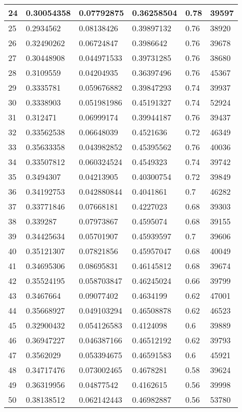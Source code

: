 \begin{longtable}{|l|l|l|l|l|l|}
24 & 0.30054358 & 0.07792875 & 0.36258504 & 0.78 & 39597 \\ \hline 
25 & 0.2934562 & 0.08138426 & 0.39897132 & 0.76 & 38920 \\ \hline 
26 & 0.32490262 & 0.06724847 & 0.3986642 & 0.76 & 39678 \\ \hline 
27 & 0.30448908 & 0.044971533 & 0.39731285 & 0.76 & 38680 \\ \hline 
28 & 0.3109559 & 0.04204935 & 0.36397496 & 0.76 & 45367 \\ \hline 
29 & 0.3335781 & 0.059676882 & 0.39847293 & 0.74 & 39937 \\ \hline 
30 & 0.3338903 & 0.051981986 & 0.45191327 & 0.74 & 52924 \\ \hline 
31 & 0.312471 & 0.06999174 & 0.39944187 & 0.76 & 39437 \\ \hline 
32 & 0.33562538 & 0.06648039 & 0.4521636 & 0.72 & 46349 \\ \hline 
33 & 0.35633358 & 0.043982852 & 0.45395562 & 0.76 & 40036 \\ \hline 
34 & 0.33507812 & 0.060324524 & 0.4549323 & 0.74 & 39742 \\ \hline 
35 & 0.3494307 & 0.04213905 & 0.40300754 & 0.72 & 39849 \\ \hline 
36 & 0.34192753 & 0.042880844 & 0.4041861 & 0.7 & 46282 \\ \hline 
37 & 0.33771846 & 0.07668181 & 0.4227023 & 0.68 & 39303 \\ \hline 
38 & 0.339287 & 0.07973867 & 0.4595074 & 0.68 & 39155 \\ \hline 
39 & 0.34425634 & 0.05701907 & 0.45939597 & 0.7 & 39606 \\ \hline 
40 & 0.35121307 & 0.07821856 & 0.45957047 & 0.68 & 40049 \\ \hline 
41 & 0.34695306 & 0.08695831 & 0.46145812 & 0.68 & 39674 \\ \hline 
42 & 0.35524195 & 0.058703847 & 0.46245024 & 0.66 & 39799 \\ \hline 
43 & 0.3467664 & 0.09077402 & 0.4634199 & 0.62 & 47001 \\ \hline 
44 & 0.35668927 & 0.049103294 & 0.46508878 & 0.62 & 46523 \\ \hline 
45 & 0.32900432 & 0.054126583 & 0.4124098 & 0.6 & 39889 \\ \hline 
46 & 0.36947227 & 0.046387166 & 0.46512192 & 0.62 & 39793 \\ \hline 
47 & 0.3562029 & 0.053394675 & 0.46591583 & 0.6 & 45921 \\ \hline 
48 & 0.34717476 & 0.073002465 & 0.4678281 & 0.58 & 39624 \\ \hline 
49 & 0.36319956 & 0.04877542 & 0.4162615 & 0.56 & 39998 \\ \hline 
50 & 0.38138512 & 0.062142443 & 0.46982887 & 0.56 & 53780 \\ \hline 
\end{longtable}